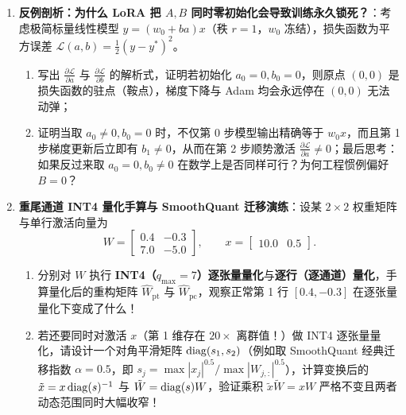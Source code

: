\begin{enumerate}
  \item[\textbf{6.6.5}] \textbf{反例剖析：为什么 LoRA 把 $A, B$ 同时零初始化会导致训练永久锁死？}：考虑极简标量线性模型 $y = (w_0 + b a) x$（秩 $r = 1$，$w_0$ 冻结），损失函数为平方误差 $\mathcal{L}(a, b) = \frac{1}{2}(y - y^*)^2$。
  \begin{enumerate}
    \item 写出 $\frac{\partial \mathcal{L}}{\partial a}$ 与 $\frac{\partial \mathcal{L}}{\partial b}$ 的解析式，证明若初始化 $a_0 = 0, b_0 = 0$，则原点 $(0, 0)$ 是损失函数的驻点（鞍点），梯度下降与 Adam 均会永远停在 $(0, 0)$ 无法动弹；
    \item 证明当取 $a_0 \neq 0, b_0 = 0$ 时，不仅第 0 步模型输出精确等于 $w_0 x$，而且第 1 步梯度更新后立即有 $b_1 \neq 0$，从而在第 2 步顺势激活 $\frac{\partial \mathcal{L}}{\partial a} \neq 0$；最后思考：如果反过来取 $a_0 = 0, b_0 \neq 0$ 在数学上是否同样可行？为何工程惯例偏好 $B = 0$？
  \end{enumerate}

  \item[\textbf{6.6.6}] \textbf{重尾通道 INT4 量化手算与 SmoothQuant 迁移演练}：设某 $2\times 2$ 权重矩阵与单行激活向量为
  \[
    W = \begin{bmatrix} 0.4 & -0.3 \\ 7.0 & -5.0 \end{bmatrix}, \qquad
    x = \begin{bmatrix} 10.0 & 0.5 \end{bmatrix}.
  \]
  \begin{enumerate}
    \item 分别对 $W$ 执行 \textbf{INT4（$q_{\max} = 7$）逐张量量化}与\textbf{逐行（逐通道）量化}，手算量化后的重构矩阵 $\hat{W}_{\mathrm{pt}}$ 与 $\hat{W}_{\mathrm{pc}}$，观察正常第 1 行 $[0.4, -0.3]$ 在逐张量量化下变成了什么！
    \item 若还要同时对激活 $x$（第 1 维存在 $20\times$ 离群值！）做 INT4 逐张量量化，请设计一个对角平滑矩阵 $\operatorname{diag}(s_1, s_2)$（例如取 SmoothQuant 经典迁移指数 $\alpha = 0.5$，即 $s_j = \max|x_j|^{0.5} / \max|W_{j,:}|^{0.5}$），计算变换后的 $\tilde{x} = x \operatorname{diag}(s)^{-1}$ 与 $\tilde{W} = \operatorname{diag}(s) W$，验证乘积 $\tilde{x} \tilde{W} = x W$ 严格不变且两者动态范围同时大幅收窄！
  \end{enumerate}
\end{enumerate}

